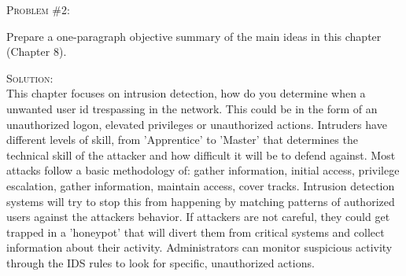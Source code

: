 \documentclass[12pt]{article}
\newenvironment{problem}[1]
{\begin{mdframed}[linewidth=0.8pt]
        \textsc{Problem #1:}

}
    {\end{mdframed}}
\newenvironment{solution}
    {\textsc{Solution:}\\}
    {\newpage}%
\begin{document}
	\begin{problem}{\#2}
		Prepare a one-paragraph objective summary of the main ideas in this chapter (Chapter 8).
	\end{problem}
	\begin{solution}
		This chapter focuses on intrusion detection, how do you determine when a unwanted user id trespassing in the network. This could be in the form of an unauthorized logon, elevated privileges or unauthorized actions. Intruders have different levels of skill, from 'Apprentice' to 'Master' that determines the technical skill of the attacker and how difficult it will be to defend against. Most attacks follow a basic methodology of: gather information, initial access, privilege escalation, gather information, maintain access, cover tracks. Intrusion detection systems will try to stop this from happening by matching patterns of authorized users against the attackers behavior. If attackers are not careful, they could get trapped in a 'honeypot' that will divert them from critical systems and collect information about their activity. Administrators can monitor suspicious activity through the IDS rules to look for specific, unauthorized actions.
	\end{solution}
\end{document}
